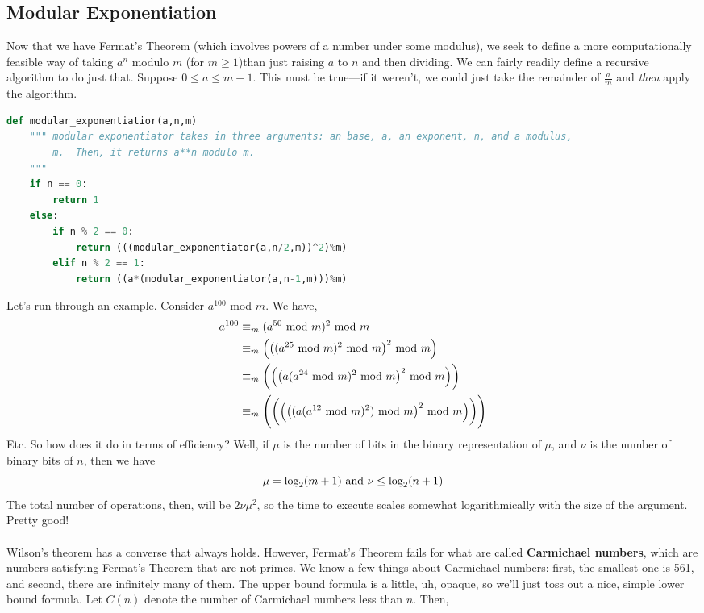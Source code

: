 \documentclass[10pt]{article}
\renewcommand\mod{{\textnormal{~mod~}}}
\theoremstyle{definition}
\begin{document}
\subsection{Modular Exponentiation}
Now that we have Fermat's Theorem (which involves powers of a number under some modulus), we seek to define a more computationally feasible way of taking $a^{n}$ modulo $m$ (for $m\geq 1$)than just raising $a$ to $n$ and then dividing.  We can fairly readily define a recursive algorithm to do just that.  Suppose $0 \leq a \leq m-1$.  This must be true---if it weren't, we could just take the remainder of $\frac{a}{m}$ and \textit{then} apply the algorithm.  
\begin{lstlisting}[language=Python]
def modular_exponentiatior(a,n,m) 
	""" modular exponentiator takes in three arguments: an base, a, an exponent, n, and a modulus, 
	    m.  Then, it returns a**n modulo m. 
	"""
	if n == 0:
		return 1
	else:
		if n % 2 == 0:
			return (((modular_exponentiator(a,n/2,m))^2)%m)
		elif n % 2 == 1:
			return ((a*(modular_exponentiator(a,n-1,m)))%m)
\end{lstlisting}
Let's run through an example.  Consider $a^{100}$ mod $m$.  We have, 
\begin{align*}
a^{100} &\equiv_m (a^{50}\mod m)^2 \mod m \\ 
&\equiv_m \Big(\big((a^{25}\mod m)^2 \mod m\big)^2 \mod m\Big) \\ 
&\equiv_m \bigg(\Big(\big(a(a^{24}\mod m)^2 \mod m\big)^2 \mod m\Big)\bigg) \\ 
&\equiv_m \Bigg(\bigg(\Big(\big((a(a^{12}\mod m)^2)\mod m\big)^2 \mod m\Big)\bigg)\Bigg)
\end{align*} 
Etc.  So how does it do in terms of efficiency?  Well, if $\mu$ is the number of bits in the binary representation of $\mu$, and $\nu$ is the number of binary bits of $n$, then we have 
\[\mu = \log_2(m+1) \textnormal{~and~} \nu \leq \log_2(n+1) \]
The total number of operations, then, will be $2\nu\mu^2$, so the time to execute scales somewhat logarithmically with the size of the argument.  Pretty good!\\~\\
Wilson's theorem has a converse that always holds.  However, Fermat's Theorem fails for what are called \textbf{Carmichael numbers}, which are numbers satisfying Fermat's Theorem that are not primes.  We know a few things about Carmichael numbers: first, the smallest one is 561, and second, there are infinitely many of them.  The upper bound formula is a little, uh, opaque, so we'll just toss out a nice, simple lower bound formula.  Let $C(n)$ denote the number of Carmichael numbers less than $n$.  Then, 
\end{document}
